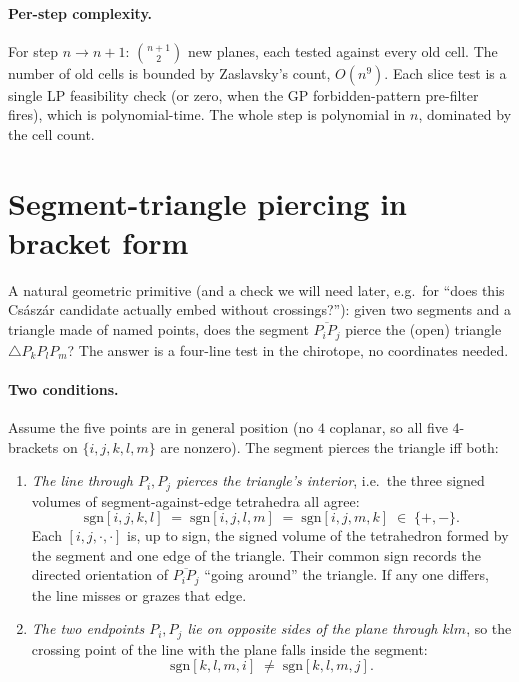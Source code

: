 \documentclass[11pt]{article}
\begin{document}
\paragraph{Per-step complexity.} For step $n \to n{+}1$: $\binom{n+1}{2}$ new
planes, each tested against every old cell. The number of old cells is
bounded by Zaslavsky's count, $O(n^9)$. Each slice test is a single LP
feasibility check (or zero, when the GP forbidden-pattern pre-filter
fires), which is polynomial-time. The whole step is polynomial in $n$,
dominated by the cell count.

\section*{Segment-triangle piercing in bracket form}

A natural geometric primitive (and a check we will need later, e.g.\ for
``does this Cs\'asz\'ar candidate actually embed without crossings?''): given
two segments and a triangle made of named points, does the segment
$\overline{P_iP_j}$ pierce the (open) triangle $\triangle P_kP_lP_m$? The
answer is a four-line test in the chirotope, no coordinates needed.

\paragraph{Two conditions.} Assume the five points are in general position
(no $4$ coplanar, so all five $4$-brackets on $\{i,j,k,l,m\}$ are nonzero).
The segment pierces the triangle iff both:

\begin{enumerate}
  \item \emph{The line through $P_i,P_j$ pierces the triangle's interior},
  i.e.\ the three signed volumes of segment-against-edge tetrahedra all
  agree:
  \[
    \mathrm{sgn}[i,j,k,l] \;=\; \mathrm{sgn}[i,j,l,m] \;=\; \mathrm{sgn}[i,j,m,k]
    \;\in\;\{+,-\}.
  \]
  Each $[i,j,\cdot,\cdot]$ is, up to sign, the signed volume of the
  tetrahedron formed by the segment and one edge of the triangle. Their
  common sign records the directed orientation of $\overline{P_iP_j}$
  ``going around'' the triangle. If any one differs, the line misses or
  grazes that edge.

  \item \emph{The two endpoints $P_i,P_j$ lie on opposite sides of the
  plane through $klm$}, so the crossing point of the line with the plane
  falls inside the segment:
  \[
    \mathrm{sgn}[k,l,m,i] \;\neq\; \mathrm{sgn}[k,l,m,j].
  \]
\end{enumerate}
\end{document}
